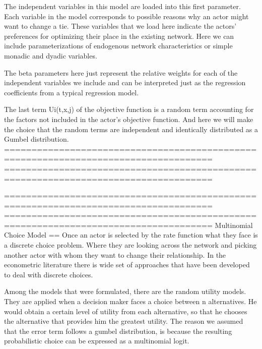 The independent variables in this model are loaded into this first parameter. Each variable in the model corresponds to possible reasons why an actor might want to change a tie. These variables that we load here indicate the actors’ preferences for optimizing their place in the existing network. Here we can include parameterizations of endogenous network characteristics or simple monadic and dyadic variables. 

The beta parameters here just represent the relative weights for each of the independent variables we include and can be interpreted just as the regression coefficients from a typical regression model.


The last term Ui(t,x,j) of the objective function is a random term accounting for the factors not included in the actor's objective function. And here we will make the choice that the random terms are independent and identically distributed as a  Gumbel distribution.
====================================================================================
====================================================================================

====================================================================================
====================================================================================
Multinomial Choice Model
==
Once an actor is selected by the rate function what they face is a discrete choice problem. Where they are looking across the network and picking another actor with whom they want to change their relationship. In the econometric literature there is wide set of approaches that have been developed to deal with discrete choices. 

Among the models that were formulated, there are the random utility models. They are applied when a decision maker faces a choice between n alternatives. He would obtain a certain level of utility from each alternative, so that he chooses the alternative that provides him the greatest utility. The reason we assumed that the error term follows a gumbel distribution, is because the resulting probabilistic choice can be expressed as a multinomial logit. 


